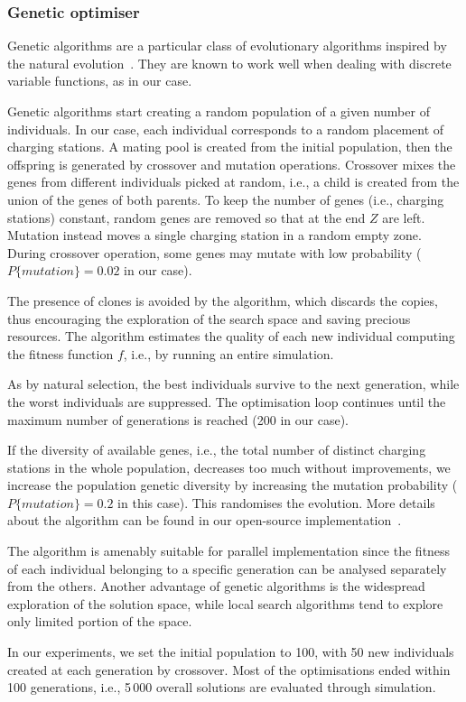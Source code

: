 \subsubsection{Genetic optimiser}

Genetic algorithms are a particular class of evolutionary algorithms inspired by the natural evolution~\cite{GO89}. They are known to work well when dealing with discrete variable functions, as in our case. 

Genetic algorithms start creating a random population of a given number of individuals. In our case, each individual corresponds to a random placement of charging stations. A mating pool is created from the initial population, then the offspring is generated by crossover and mutation operations. Crossover mixes the genes from different individuals picked at random, i.e., a child is created from the union of the genes of both parents. To keep the number of genes (i.e., charging stations) constant, random genes are removed so that at the end $Z$ are left.
Mutation instead moves a single charging station in a random empty zone. During crossover operation, some genes may mutate with low probability ($P\{mutation\}=0.02$ in our case).

The presence of clones is avoided by the algorithm, which discards the copies, thus encouraging the exploration of the search space and saving precious resources. The algorithm estimates the quality of each new individual computing the fitness function $f$, i.e., by running an entire simulation.

As by natural selection, the best individuals survive to the next generation, while the worst individuals are suppressed. 
The optimisation loop continues until the maximum number of generations is reached (200 in our case).

If the diversity of available genes, i.e., the total number of distinct charging stations in the whole population, decreases too much without improvements, we increase the population genetic diversity by increasing the mutation probability ($P\{mutation\}=0.2$ in this case). This randomises the evolution. More details about the algorithm can be found in our open-source implementation~\cite{MicheleGithub}.

The algorithm is amenably suitable for parallel implementation since the fitness of each individual belonging to a specific generation can be analysed separately from the others. Another advantage of genetic algorithms is the widespread exploration of the solution space, while local search algorithms tend to explore only limited portion of the space.

In our experiments, we set the initial population to 100, with 50 new individuals created at each generation by crossover. Most of the optimisations ended within 100 generations, i.e., 5\,000 overall solutions are evaluated through simulation.